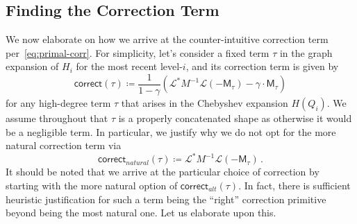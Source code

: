 \documentclass[12pt]{article}
\newcommand{\gam}{\gamma}
\newcommand{\cm}{\mathsf{M} }
\newcommand{\corr}{\mathsf{correct}}
\newcommand{\calL}{\mathcal{L}}
\newcommand{\Authornote}[3]{{\sf\footnotesize\color{#3}{[#1: #2]}}}
\newcommand{\Authornote}[3]{}
\newcommand{\jnote}[1]{\Authornote{Jeff}{#1}{blue}}
\begin{document}
\subsection{Finding the Correction Term} \label{sec:cooking-correction}
We now elaborate on how we arrive at the counter-intuitive correction term per~\cref{eq:primal-corr}. For simplicity, let's consider a fixed term $\tau$ in the graph expansion of $H_i$ for the most recent level-$i$, and its correction term is given by \[ 
\corr(\tau) \coloneqq \frac{1}{1-\gamma} (\calL^*M^{-1}\calL(-\cm_\tau) -\gam \cdot \cm_\tau) 
\]
for any high-degree term $\tau$ that arises in the Chebyshev expansion $H(Q_i)$. We assume throughout that $\tau$ is a properly concatenated shape as otherwise it would be a negligible term.  In particular, we justify why we do not opt for the more natural correction term via \[
\corr_{natural}(\tau) \coloneqq \calL^*M^{-1} \calL (-\cm_\tau)\,.
\]
It should be noted that we arrive at the particular choice of correction by starting with the more natural option of $\corr_{alt}(\tau)$. In fact, there is sufficient heuristic justification for such a term being the ``right'' correction primitive beyond being the most natural one. Let us elaborate upon this.
\end{document}
